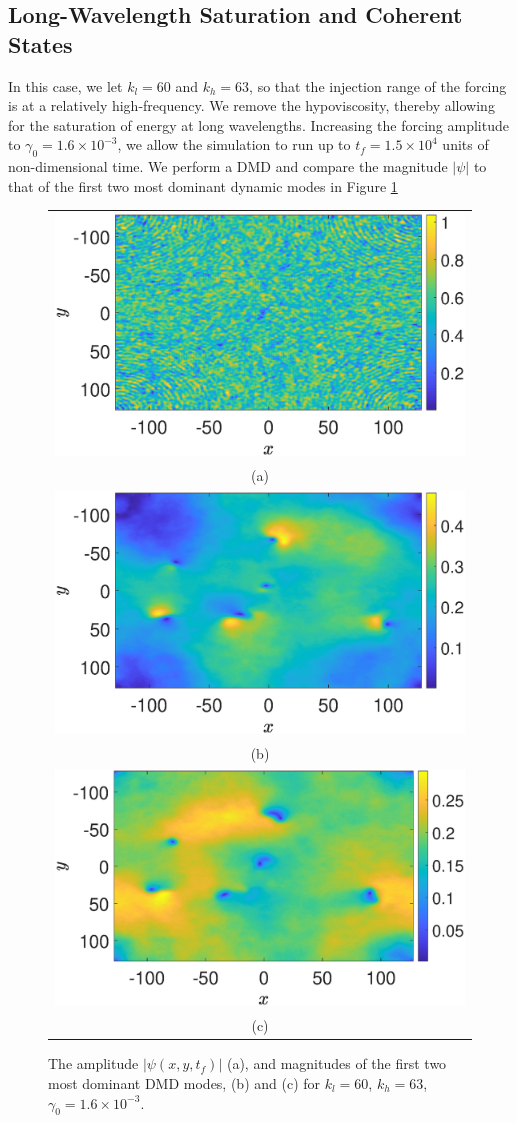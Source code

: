 \documentclass[a4paper,11pt]{article}
\begin{document}
\subsection*{Long-Wavelength Saturation and Coherent States}
In this case, we let $k_{l}=60$ and $k_{h}=63$, so that the injection range of the forcing is at a relatively high-frequency.  We remove the hypoviscosity, thereby allowing for the saturation of energy at long wavelengths.  Increasing the forcing amplitude to $\gamma_{0}=1.6\times 10^{-3}$, we allow the simulation to run up to $t_{f}=1.5\times 10^{4}$ units of non-dimensional time.  We perform a DMD and compare the magnitude $\left|\psi\right|$ to that of the first two most dominant dynamic modes in Figure \ref{fig:ampcomphf}
\begin{figure}
\centering
\begin{tabular}{c}
\includegraphics[width=.7\textwidth]{amplitude_hfforce_K_256_Lx_128_tf_1pt5e4} \\
(a) \\
\includegraphics[width=.7\textwidth]{dmd1_amplitude_hfforce_K_256_Lx_128_tf_1pt5e4} \\
 (b) \\
\includegraphics[width=.7\textwidth]{dmd2_amplitude_hfforce_K_256_Lx_128_tf_1pt5e4} \\
(c)
\end{tabular}
\caption{The amplitude $\left|\psi(x,y,t_{f})\right|$ (a), and magnitudes of the  first two most dominant DMD modes, (b) and (c) for $k_{l}=60$, $k_{h}=63$, $\gamma_{0}=1.6\times 10^{-3}$. }
\label{fig:ampcomphf}
\end{figure}
\end{document}
